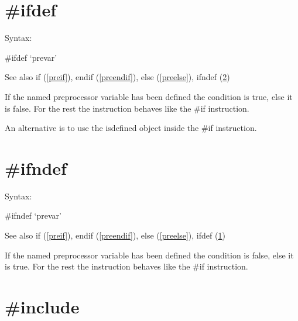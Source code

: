  


\section{\#ifdef}
\label{preifdef}

\noindent Syntax:

\#ifdef `prevar'
 
\noindent See also if (\ref{preif}),
            endif (\ref{preendif}),
            else (\ref{preelse}),
            ifndef (\ref{preifndef})

\noindent If the named preprocessor variable has been 
defined the condition is true, else it is false. For the rest the 
instruction behaves like the \#if instruction.

An alternative is to use the isdefined object inside the \#if instruction.


\section{\#ifndef}
\label{preifndef}

\noindent Syntax:

\#ifndef `prevar'
 
\noindent See also if (\ref{preif}),
            endif (\ref{preendif}),
            else (\ref{preelse}),
            ifdef (\ref{preifdef})

\noindent If the named preprocessor variable has been 
defined the condition is false, else it is true. For the rest the 
instruction behaves like the \#if instruction.


\section{\#include}
\label{preinclude}

